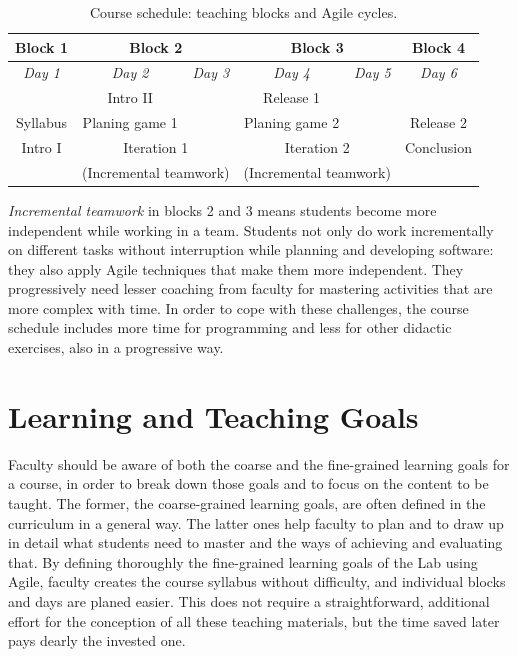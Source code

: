 \documentclass[conference]{IEEEtran}
\begin{document}
\begin{table}[!t]
  \renewcommand{\arraystretch}{1.3}
  \setlength{\tabcolsep}{0.6em}
  \caption{Course schedule: teaching blocks and Agile cycles.}
  \label{tab:Agileblocks}
  \centering
  \begin{tabular}{|c|cc|cc|c|}
    \hline
    \bfseries Block 1 & \multicolumn{2}{|c|}{\bfseries Block 2} & \multicolumn{2}{|c|}{\bfseries Block 3} & \bfseries Block 4\\
    \hline
    \textit{Day 1} & \multicolumn{1}{|c|}{\textit{Day 2}} & \textit{Day 3} & \multicolumn{1}{|c|}{\textit{Day 4}} & \textit{Day 5} & \textit{Day 6}\\
    \hline
    \hline
    & \multicolumn{1}{|c|}{Intro II} &  & \multicolumn{1}{|c|}{Release 1} &  & \\
    Syllabus & \multicolumn{1}{|c|}{Planing game 1} &  & \multicolumn{1}{|c|}{Planing game 2} &  & Release 2 \\
    \cline{2-2}
    \cline{4-4}
    Intro I & \multicolumn{2}{|c|}{Iteration 1} & \multicolumn{2}{|c|}{Iteration 2} & Conclusion \\
    & \multicolumn{2}{|c|}{(Incremental teamwork)} & \multicolumn{2}{|c|}{(Incremental teamwork)} & \\
    \hline
\end{tabular}
\end{table}

\textit{Incremental teamwork} in blocks 2 and 3 means students become more independent while working in a team. Students not only do work incrementally on different tasks without interruption while planning and developing software: they also apply Agile techniques that make them more independent. They progressively need lesser coaching from faculty for mastering activities that are more complex with time. In order to cope with these challenges, the course schedule includes more time for programming and less for other didactic exercises, also in a progressive way.


\section{Learning and Teaching Goals}
\label{sec:coursegoals}

Faculty should be aware of both the coarse and the fine-grained learning goals for a course, in order to break down those goals and to focus on the content to be taught. The former, the coarse-grained learning goals, are often defined in the curriculum in a general way. The latter ones help faculty to plan and to draw up in detail what students need to master and the ways of achieving and evaluating that. By defining thoroughly the fine-grained learning goals of the Lab using Agile, faculty creates the course syllabus without difficulty, and individual blocks and days are planed easier. This does not require a straightforward, additional effort for the conception of all these teaching materials, but the time saved later pays dearly the invested one.
\end{document}

